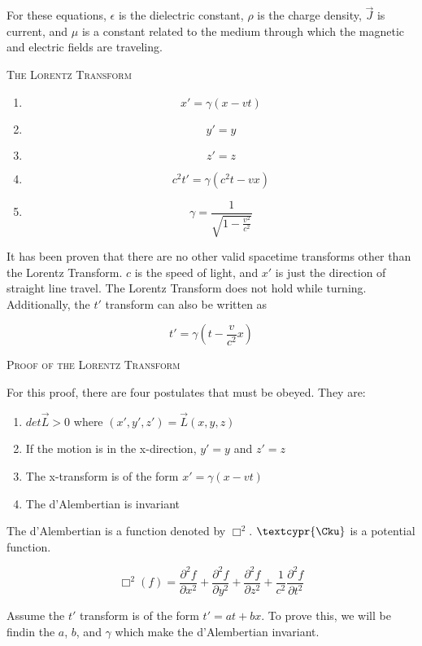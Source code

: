 \documentclass{article}
\begin{document}
For these equations, $\epsilon$ is the dielectric constant, $\rho$ is the charge density, $\vec{J}$ is current, and $\mu$ is a constant related to the medium through which the magnetic and electric fields are traveling.

\bigskip

\textsc{The Lorentz Transform}

\begin{enumerate}
\item \[
x' = \gamma (x - vt)
\]
\item \[
y' = y
\]
\item \[
z' = z
\]
\item \[
c^2t' = \gamma(c^2t - vx)
\]
\item\[
\gamma = \frac{1}{\sqrt{1 - \frac{v^2}{c^2}}}
\]
\end{enumerate}

It has been proven that there are no other valid spacetime transforms other than the Lorentz Transform.  $c$ is the speed of light, and $x'$ is just the direction of straight line travel.  The Lorentz Transform does not hold while turning.  Additionally, the $t'$ transform can also be written as 

\[
t' = \gamma \left(t - \frac{v}{c^2}x\right)
\]

\bigskip

\textsc{Proof of the Lorentz Transform}

For this proof, there are four postulates that must be obeyed.  They are:

\begin{enumerate}
\item $det \vec{L} > 0$ where $(x', y', z') = \vec{L}(x, y, z)$
\item If the motion is in the x-direction, $y' = y$ and $z' = z$
\item The x-transform is of the form $x' = \gamma(x - vt)$
\item The d'Alembertian is invariant
\end{enumerate}

\smallskip

The d'Alembertian is a function denoted by $\Box^2$.  $\textcypr{\Cku}$ is a potential function.

\[
\Box^2(f) = \frac{\partial^2{f}}{\partial{x}^2} + \frac{\partial^2{f}}{\partial{y}^2} + \frac{\partial^2{f}}{\partial{z}^2} + \frac{1}{c^2}\frac{\partial^2{f}}{\partial{t}^2}
\]

Assume the $t'$ transform is of the form $t' = at + bx$.  To prove this, we will be findin the $a$, $b$, and $\gamma$ which make the d'Alembertian invariant.
\end{document}
